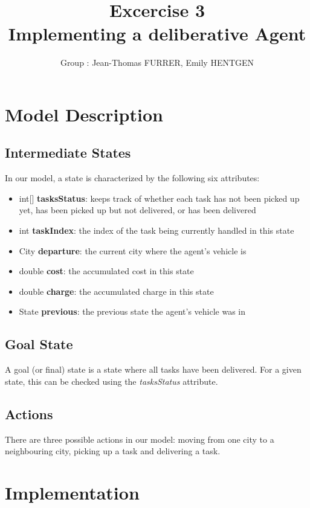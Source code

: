 \documentclass[10pt]{article}
\title{\bf Excercise 3\\ Implementing a deliberative Agent}
\author{Group \textnumero 23: Jean-Thomas FURRER, Emily HENTGEN}
\begin{document}
\maketitle

\section{Model Description}

\subsection{Intermediate States}
In our model, a state is characterized by the following six attributes:
\begin{itemize}
\itemsep 0mm
\item[\textendash]int[] \textbf{tasksStatus}: keeps track of whether each task has not been picked up yet, has been picked up but not delivered, or has been delivered
\item[\textendash]int \textbf{taskIndex}: the index of the task being currently handled in this state
\item[\textendash]City \textbf{departure}: the current city where the agent's vehicle is
\item[\textendash]double \textbf{cost}: the accumulated cost in this state
\item[\textendash]double \textbf{charge}: the accumulated charge in this state
\item[\textendash]State \textbf{previous}: the previous state the agent's vehicle was in
\end{itemize}

\subsection{Goal State}
A goal (or final) state is a state where all tasks have been delivered. For a given state, this can be checked using the \textit{tasksStatus} attribute.

\subsection{Actions}
There are three possible actions in our model: moving from one city to a neighbouring city, picking up a task and delivering a task.

\section{Implementation}
\end{document}
